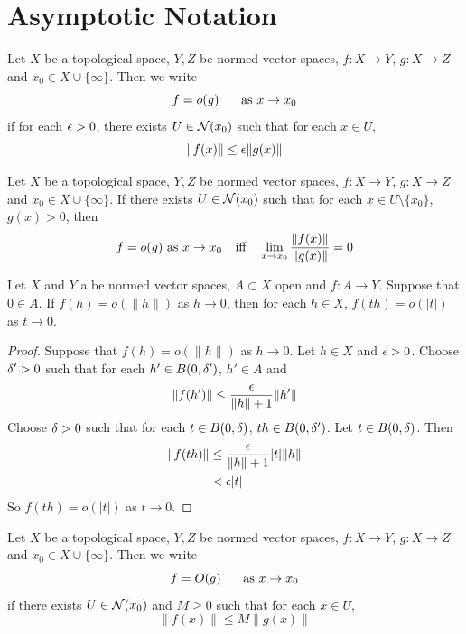 \documentclass{book}
\begin{document}
 \newpage	
 
 \chapter{Asymptotic Notation}
 
 \begin{defn} \ld{}
 	Let $X$ be a topological space, $Y, Z$ be normed vector spaces, $f:X \rightarrow Y$, $g: X \rightarrow Z$ and $x_0 \in X \cup \{\infty\}$. Then we write $$f = o(g) \hspace{.5cm} \text{ as } x \rightarrow x_0$$ if for each $\epsilon >0$, there exists $U \in \mathcal{N}(x_0)$ such that for each $x \in U$, $$\|f(x)\| \leq \epsilon\|g(x)\|$$
 \end{defn}
 
 \begin{ex} \lex{}
 	Let $X$ be a topological space, $Y, Z$ be normed vector spaces, $f:X \rightarrow Y$, $g: X \rightarrow Z$ and $x_0 \in X \cup \{\infty\}$. If there exists $U \in \mathcal{N}(x_0)$ such that for each $x \in U \setminus \{x_0\}$, $g(x) > 0$, then $$f = o(g) \text{ as } x \rightarrow x_0 \hspace{.25cm} \text{ iff } \hspace{.25cm}  \lim_{x \rightarrow x_0} \frac{\| f(x) \|}{\| g(x) \|} = 0$$
 \end{ex}	
 
 \begin{ex} \lex{}
 	Let $X$ and $Y$ a be normed vector spaces, $A \subset X$ open and $f:A \rightarrow Y$. Suppose that $0 \in A$. If $f(h) = o(\|h\|)$ as $h \rightarrow 0$, then for each $h \in X$,  $f(th) = o(|t|)$ as $t \rightarrow 0$.
 \end{ex}	
 
 \begin{proof}
 	Suppose that $f(h) = o(\|h\|)$ as $h \rightarrow 0$.  Let $h \in X$ and $\epsilon >0$. Choose $\delta' >0 $ such that for each $h' \in B(0, \delta')$, $h' \in A$ and 
 	$$\|f(h')\| \leq \frac{\epsilon}{\|h\|+1} \|h'\|$$ 
 	Choose $\delta >0$ such that for each $t \in B(0,\delta)$, $th \in B(0,\delta')$. Let $t \in B(0,\delta)$. Then 
 	\begin{align*}
 		\|f(th)\| 
 		&\leq \frac{\epsilon}{\|h\|+1} |t|\|h\| \\
 		&< \epsilon |t|
 	\end{align*}
 	So $f(th) = o(|t|)$ as $t \rightarrow 0$.
 \end{proof}		
 
 
 
 
 \begin{defn} \ld{}
 	Let $X$ be a topological space, $Y, Z$ be normed vector spaces, $f:X \rightarrow Y$, $g: X \rightarrow Z$ and $x_0 \in X \cup \{\infty\}$. Then we write $$f = O(g) \hspace{.5cm} \text{ as } x \rightarrow x_0$$ if there exists $U \in \mathcal{N}(x_0)$ and $M \geq 0$ such that for each $x \in U$, $$\|f(x)\| \leq M\|g(x)\|$$
 \end{defn}
 
\end{document}
